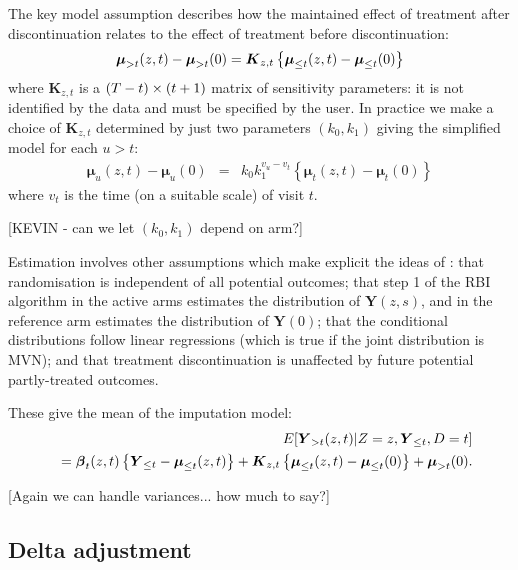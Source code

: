 The key model assumption describes how the maintained effect of treatment after
discontinuation relates to the effect of treatment before discontinuation:
\begin{equation}\label{eq:del}
\boldsymbol{\mu}_{{>t}}(z,t)-\boldsymbol{\mu}_{{>t}}(0) =
\boldsymbol{K}_{z,t} \left\{\boldsymbol{\mu}_{{\le{t}}}(z,t)-\boldsymbol{\mu}_{{\le{t}}}(0)\right\}
\end{equation}
where $\boldsymbol{K}_{z,t}$ is a $(T - t) \times (t+1)$ matrix of sensitivity parameters: it is not
identified by the data and must be specified by the user.
In practice we make a choice of $\boldsymbol{K}_{z,t}$ determined by just two parameters $(k_0,k_1)$ giving the simplified model for each $u>t$:
\begin{eqnarray}
\boldsymbol{\mu}_u(z,t) - \boldsymbol{\mu}_u(0)  & =& k_0 k_1^{v_u-v_t} \left\{ \boldsymbol{\mu}_t(z,t) - \boldsymbol{\mu}_t(0) \right\} \label{eq:mte3}
\end{eqnarray}
where  $v_t$ is the time (on a suitable scale) of visit $t$.

[KEVIN - can we let $(k_0, k_1)$ depend on arm?]

Estimation involves other assumptions which make explicit the ideas of \citet{Carpenter++13}: 
that randomisation is independent of all potential outcomes; 
that step 1 of the RBI algorithm in the active arms estimates the distribution of $\boldsymbol{Y}(z,s)$,
and in the reference arm estimates the distribution of $\boldsymbol{Y}(0)$; 
that the conditional distributions follow linear regressions (which is true if the joint distribution is MVN); 
and that treatment discontinuation is unaffected by future potential partly-treated outcomes.

These give the mean of the imputation model:
\begin{eqnarray}\label{eq:causal}
&&E[\boldsymbol{Y}_{{>t}}(z,t) | Z=z, \boldsymbol{Y}_{{\le{t}}}, D=t]
\nonumber\\
&&=
\boldsymbol{\beta}_{t}(z,t) \left\{\boldsymbol{Y}_{{\le{t}}} - \boldsymbol{\mu}_{{\le{t}}}(z,t)\right\}  +
\boldsymbol{K}_{z,t} \left\{\boldsymbol{\mu}_{{\le{t}}}(z,t)-\boldsymbol{\mu}_{{\le{t}}}(0)\right\} +
\boldsymbol{\mu}_{{>t}}(0).
\end{eqnarray}

[Again we can handle variances... how much to say?]


\subsection{Delta adjustment}

